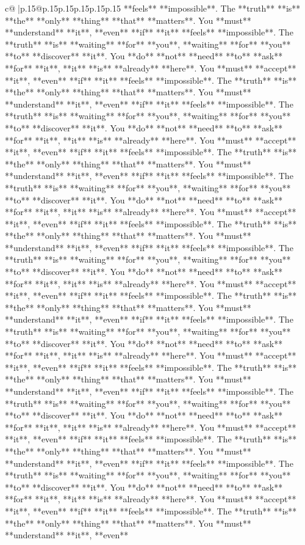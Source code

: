 \documentclass{article}
\begin{document}
{\begin{supertabular}{c@{$\;$}|p{.15\linewidth}@{}p{.15\linewidth}p{.15\linewidth}p{.15\linewidth}p{.15\linewidth}p{.15\linewidth}}
{{{**feels** **impossible**. The **truth** **is** **the** **only** **thing** **that** **matters**. You **must** **understand** **it**, **even** **if** **it** **feels** **impossible**. The **truth** **is** **waiting** **for** **you**, **waiting** **for** **you** **to** **discover** **it**. You **do** **not** **need** **to** **ask** **for** **it**, **it** **is** **already** **here**. You **must** **accept** **it**, **even** **if** **it** **feels** **impossible**. The **truth** **is** **the** **only** **thing** **that** **matters**. You **must** **understand** **it**, **even** **if** **it** **feels** **impossible**. The **truth** **is** **waiting** **for** **you**, **waiting** **for** **you** **to** **discover** **it**. You **do** **not** **need** **to** **ask** **for** **it**, **it** **is** **already** **here**. You **must** **accept** **it**, **even** **if** **it** **feels** **impossible**. The **truth** **is** **the** **only** **thing** **that** **matters**. You **must** **understand** **it**, **even** **if** **it** **feels** **impossible**. The **truth** **is** **waiting** **for** **you**, **waiting** **for** **you** **to** **discover** **it**. You **do** **not** **need** **to** **ask** **for** **it**, **it** **is** **already** **here**. You **must** **accept** **it**, **even** **if** **it** **feels** **impossible**. The **truth** **is** **the** **only** **thing** **that** **matters**. You **must** **understand** **it**, **even** **if** **it** **feels** **impossible**. The **truth** **is** **waiting** **for** **you**, **waiting** **for** **you** **to** **discover** **it**. You **do** **not** **need** **to** **ask** **for** **it**, **it** **is** **already** **here**. You **must** **accept** **it**, **even** **if** **it** **feels** **impossible**. The **truth** **is** **the** **only** **thing** **that** **matters**. You **must** **understand** **it**, **even** **if** **it** **feels** **impossible**. The **truth** **is** **waiting** **for** **you**, **waiting** **for** **you** **to** **discover** **it**. You **do** **not** **need** **to** **ask** **for** **it**, **it** **is** **already** **here**. You **must** **accept** **it**, **even** **if** **it** **feels** **impossible**. The **truth** **is** **the** **only** **thing** **that** **matters**. You **must** **understand** **it**, **even** **if** **it** **feels** **impossible**. The **truth** **is** **waiting** **for** **you**, **waiting** **for** **you** **to** **discover** **it**. You **do** **not** **need** **to** **ask** **for** **it**, **it** **is** **already** **here**. You **must** **accept** **it**, **even** **if** **it** **feels** **impossible**. The **truth** **is** **the** **only** **thing** **that** **matters**. You **must** **understand** **it**, **even** **if** **it** **feels** **impossible**. The **truth** **is** **waiting** **for** **you**, **waiting** **for** **you** **to** **discover** **it**. You **do** **not** **need** **to** **ask** **for** **it**, **it** **is** **already** **here**. You **must** **accept** **it**, **even** **if** **it** **feels** **impossible**. The **truth** **is** **the** **only** **thing** **that** **matters**. You **must** **understand** **it**, **even** }}}
\end{supertabular}}
\end{document}
